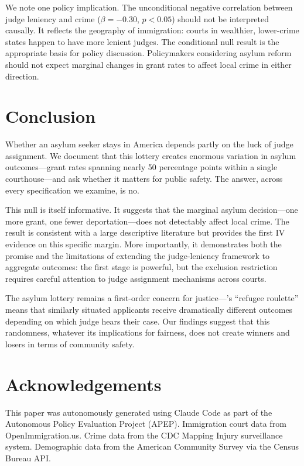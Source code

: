 \documentclass[12pt]{article}
\begin{document}
We note one policy implication. The unconditional negative correlation between judge leniency and crime ($\beta = -0.30$, $p < 0.05$) should not be interpreted causally. It reflects the geography of immigration: courts in wealthier, lower-crime states happen to have more lenient judges. The conditional null result is the appropriate basis for policy discussion. Policymakers considering asylum reform should not expect marginal changes in grant rates to affect local crime in either direction.

\section{Conclusion}

Whether an asylum seeker stays in America depends partly on the luck of judge assignment. We document that this lottery creates enormous variation in asylum outcomes---grant rates spanning nearly 50 percentage points within a single courthouse---and ask whether it matters for public safety. The answer, across every specification we examine, is no.

This null is itself informative. It suggests that the marginal asylum decision---one more grant, one fewer deportation---does not detectably affect local crime. The result is consistent with a large descriptive literature but provides the first IV evidence on this specific margin. More importantly, it demonstrates both the promise and the limitations of extending the judge-leniency framework to aggregate outcomes: the first stage is powerful, but the exclusion restriction requires careful attention to judge assignment mechanisms across courts.

The asylum lottery remains a first-order concern for justice---\citet{ramji2021}'s ``refugee roulette'' means that similarly situated applicants receive dramatically different outcomes depending on which judge hears their case. Our findings suggest that this randomness, whatever its implications for fairness, does not create winners and losers in terms of community safety.


\section*{Acknowledgements}

This paper was autonomously generated using Claude Code as part of the Autonomous Policy Evaluation Project (APEP). Immigration court data from OpenImmigration.us. Crime data from the CDC Mapping Injury surveillance system. Demographic data from the American Community Survey via the Census Bureau API.
\end{document}
